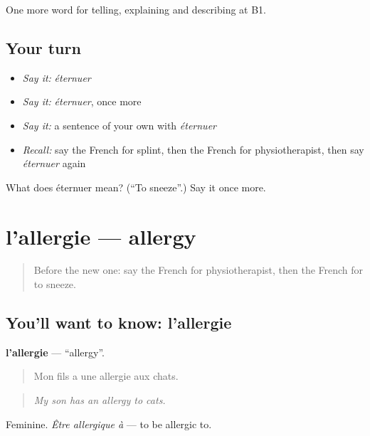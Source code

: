 \begin{grammarlens}[title={What you've built}]
One more word for telling, explaining and describing at B1.
\end{grammarlens}

\subsection*{Your turn}
\begin{itemize}
\raggedright
  \item \emph{Say it:} \emph{éternuer}
  \item \emph{Say it:} \emph{éternuer}, once more
  \item \emph{Say it:} a sentence of your own with \emph{éternuer}
  \item \emph{Recall:} say the French for splint, then the French for physiotherapist, then say \emph{éternuer} again
\end{itemize}

\begin{tcolorbox}[breakable,colback=teal!4,colframe=teal!35!black,title={Before you move on}]
What does éternuer mean? (\textquotedblleft{}To sneeze\textquotedblright{}.) Say it once more.
\end{tcolorbox}
\section[l'allergie]{l'allergie — allergy}

\label{lesson:FR-C482-allergie}



\begin{quote}
Before the new one: say the French for physiotherapist, then the French for to sneeze.
\end{quote}

\subsection*{You'll want to know: l'allergie}
\textbf{l'allergie} — \textquotedblleft{}allergy\textquotedblright{}.

\begin{quote}
Mon fils a une allergie aux chats.
\end{quote}

\begin{quote}
\emph{My son has an allergy to cats.}
\end{quote}

Feminine. \emph{Être allergique à} — to be allergic to.

